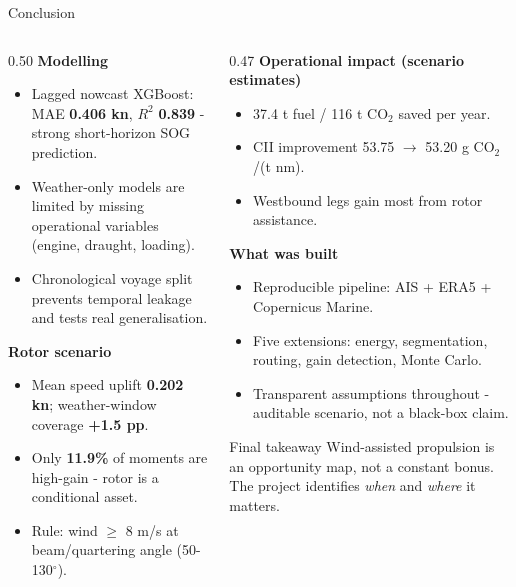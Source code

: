 \documentclass[aspectratio=169,10pt]{beamer}
\begin{document}
\begin{frame}[t]{Conclusion}
\scriptsize
\begin{columns}[T,onlytextwidth]
\begin{column}{0.50\textwidth}
\textbf{Modelling}
\begin{itemize}
  \item Lagged nowcast XGBoost: MAE \textbf{0.406 kn}, $R^2$ \textbf{0.839} - strong short-horizon SOG prediction.
  \item Weather-only models are limited by missing operational variables (engine, draught, loading).
  \item Chronological voyage split prevents temporal leakage and tests real generalisation.
\end{itemize}
\vspace{0.15cm}
\textbf{Rotor scenario}
\begin{itemize}
  \item Mean speed uplift \textbf{0.202 kn}; weather-window coverage \textbf{+1.5 pp}.
  \item Only \textbf{11.9\%} of moments are high-gain - rotor is a conditional asset.
  \item Rule: wind $\geq$ 8 m/s at beam/quartering angle (50-130$^\circ$).
\end{itemize}
\end{column}
\begin{column}{0.47\textwidth}
\textbf{Operational impact (scenario estimates)}
\begin{itemize}
  \item 37.4 t fuel / 116 t CO$_2$ saved per year.
  \item CII improvement 53.75 $\to$ 53.20 g CO$_2$/(t nm).
  \item Westbound legs gain most from rotor assistance.
\end{itemize}
\vspace{0.15cm}
\textbf{What was built}
\begin{itemize}
  \item Reproducible pipeline: AIS + ERA5 + Copernicus Marine.
  \item Five extensions: energy, segmentation, routing, gain detection, Monte Carlo.
  \item Transparent assumptions throughout - auditable scenario, not a black-box claim.
\end{itemize}

\begin{block}{Final takeaway}
Wind-assisted propulsion is an opportunity map, not a constant bonus. The project identifies \textit{when} and \textit{where} it matters.
\end{block}
\end{column}
\end{columns}
\end{frame}
\end{document}
